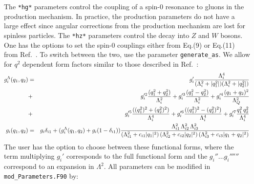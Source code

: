 \documentclass[aps,superscriptaddress,nofootinbib]{revtex4}
\begin{document}
\noindent
The \verb|*hg*| parameters control the coupling of a spin-0 resonance to gluons in the production mechanism.
In practice, the production parameters do not have a large effect since angular corrections from the production mechanism are lost for spinless particles.
The \verb|*hz*| parameters control the decay into $Z$ and $W$ bosons.
One has the options to set the spin-0 couplings either from Eq.(9) or Eq.(11) from Ref.~\cite{Bolognesi:2012}.
To switch between the two, use the parameter \verb|generate_as|.
We allow for $q^2$ dependent form factors similar to those described in Ref.~\cite{Anderson:2013}:
\begin{eqnarray*}
g^\Lambda_i(q_1,q_2) &=& 
g_i' \frac{\Lambda_i^4}{(\Lambda_i^2 + |q_1^2|)(\Lambda_i^2 + |q_2^2|)} \\
&+& g_i^{\prime 2}  \frac{(q_1^2+q_2^2)}{\Lambda_i^2} 
+ g_i^{\prime 3}  \frac{(q_1^2-q_2^2)}{\Lambda_i^2} 
+ g_i^{\prime 4}  \frac{(q_1+q_2)^2}{\Lambda_Q^2} \\
&+& g_i^{\prime 5}  \frac{((q_1^2)^2+(q_2^2)^2)}{\Lambda_i^4}  
+ g_i^{\prime 6}  \frac{((q_1^2)^2-(q_2^2)^2)}{\Lambda_i^4}
+ g_i^{\prime 7}  \frac{q_1^2 \, q_2^2}{\Lambda_i^4} \\
g_i(q_1,q_2) &=& g_i \delta_{i1} + (g^\Lambda_i (q_1,q_2) + g_i (1- \delta_{i1}))
\frac{\Lambda^2_{i1}\,\Lambda^2_{i2}\,\Lambda^2_{i3}}
{(\Lambda^2_{i1}+c_{i1}|q_1|^2)\,(\Lambda^2_{i2}+c_{i2}|q_2|^2)\,(\Lambda^2_{i3}+c_{i3}|q_1+q_2|^2)}
\noindent
\end{eqnarray*}
The user has the option to choose between these functional forms,
where the term multiplying $g_i'$ corresponds to the full functional form and the $g_i''... g_i'''''' $ correspond to an expansion in $\Lambda^2$.
All parameters can be modified in \verb|mod_Parameters.F90| by:
\end{document}
